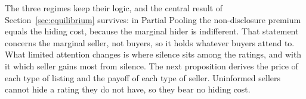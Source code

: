 The three regimes keep their logic, and the central result of Section~\ref{sec:equilibrium} survives: in Partial Pooling the non-disclosure premium equals the hiding cost, because the marginal hider is indifferent. That statement concerns the marginal seller, not buyers, so it holds whatever buyers attend to. What limited attention changes is where silence sits among the ratings, and with it which seller gains most from silence. The next proposition derives the price of each type of listing and the payoff of each type of seller. Uninformed sellers cannot hide a rating they do not have, so they bear no hiding cost.
